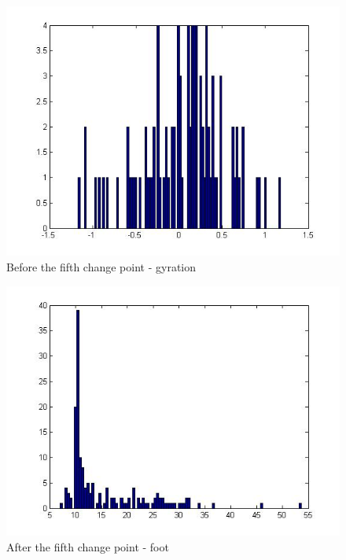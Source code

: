 \documentclass[french]{article}
\begin{document}
\begin{figure}[h]
	\includegraphics[scale=0.7]{hist3_1-gyr.jpg}
	\caption{Before the fifth change point - gyration}
\end{figure}

\begin{figure}[h]
	\includegraphics[scale=0.7]{hist1_2-foot.jpg}
	\caption{After the fifth change point - foot}
\end{figure}
\end{document}

